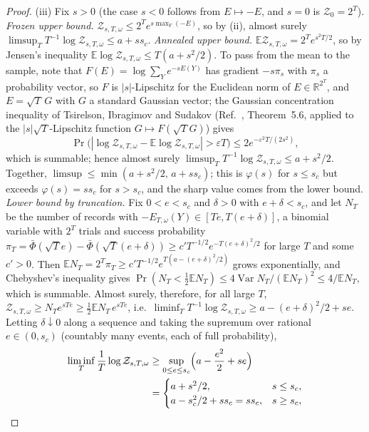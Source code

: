 \documentclass[aps,prx,reprint,superscriptaddress,nobibnotes,longbibliography]{revtex4-2}
\newcommand{\E}{\mathbb E}
\begin{document}
\begin{proof}
(iii) Fix $s>0$ (the case $s<0$ follows from $E\mapsto-E$, and $s=0$ is
$\mathcal Z_0=2^T$).  \emph{Frozen upper bound.}
$\mathcal Z_{s,T,\omega}\le2^Te^{s\max_Y(-E)}$, so by (ii), almost
surely $\limsup_TT^{-1}\log\mathcal Z_{s,T,\omega}\le a+ss_c$.
\emph{Annealed upper bound.}  $\E\mathcal Z_{s,T,\omega}=2^Te^{s^2T/2}$,
so by Jensen's inequality $\E\log\mathcal Z_{s,T,\omega}\le T(a+s^2/2)$.
To pass from the mean to the sample, note that
$F(E)=\log\sum_Ye^{-sE(Y)}$ has gradient $-s\pi_s$ with $\pi_s$ a
probability vector, so $F$ is $|s|$-Lipschitz for the Euclidean norm of
$E\in\mathbb R^{2^T}$, and $E=\sqrt T\,G$ with $G$ a standard Gaussian
vector; the Gaussian concentration inequality of Tsirelson, Ibragimov
and Sudakov (Ref.~\cite{BLM2013}, Theorem~5.6, applied to the
$|s|\sqrt T$-Lipschitz function $G\mapsto F(\sqrt TG)$) gives
\begin{equation}
 \Pr\bigl(|\log\mathcal Z_{s,T,\omega}-\E\log\mathcal Z_{s,T,\omega}|
 >\varepsilon T\bigr)\le2e^{-\varepsilon^2T/(2s^2)},
 \label{eqS:remconc}
\end{equation}
which is summable; hence almost surely
$\limsup_TT^{-1}\log\mathcal Z_{s,T,\omega}\le a+s^2/2$.  Together,
$\limsup\le\min(a+s^2/2,\,a+ss_c)$; this is $\varphi(s)$ for $s\le s_c$
but exceeds $\varphi(s)=ss_c$ for $s>s_c$, and the sharp value comes
from the lower bound.  \emph{Lower bound by truncation.}  Fix
$0<e<s_c$ and $\delta>0$ with $e+\delta<s_c$, and let $N_T$ be the
number of records with $-E_{T,\omega}(Y)\in[Te,T(e+\delta)]$, a binomial
variable with $2^T$ trials and success probability
$\pi_T=\bar\Phi(\sqrt Te)-\bar\Phi(\sqrt T(e+\delta))
\ge c'T^{-1/2}e^{-T(e+\delta)^2/2}$ for large $T$ and some $c'>0$.  Then
$\E N_T=2^T\pi_T\ge c'T^{-1/2}e^{T(a-(e+\delta)^2/2)}$ grows
exponentially, and Chebyshev's inequality gives
$\Pr(N_T<\tfrac12\E N_T)\le4\operatorname{Var}N_T/(\E N_T)^2\le4/\E N_T$,
which is summable.  Almost surely, therefore, for all large $T$,
$\mathcal Z_{s,T,\omega}\ge N_Te^{sTe}\ge\tfrac12\E N_T\,e^{sTe}$, i.e.\
$\liminf_TT^{-1}\log\mathcal Z_{s,T,\omega}\ge
a-(e+\delta)^2/2+se$.  Letting $\delta\downarrow0$ along a sequence and
taking the supremum over rational $e\in(0,s_c)$ (countably many events,
each of full probability),
\begin{align*}
 \liminf_T\frac1T\log\mathcal Z_{s,T,\omega}
 &\ge\sup_{0\le e\le s_c}\Bigl(a-\frac{e^2}2+se\Bigr)\\
 &=\begin{cases}a+s^2/2,&s\le s_c,\\
 a-s_c^2/2+ss_c=ss_c,&s\ge s_c,\end{cases}

\end{align*}
\end{proof}
\end{document}
